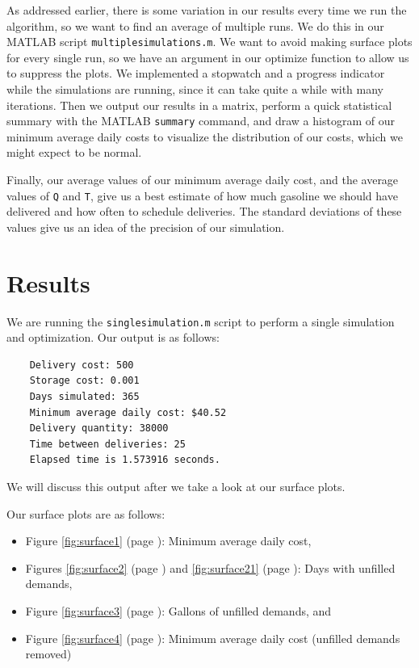\documentclass{article}
\begin{document}
    As addressed earlier, there is some variation in our results every time we run the algorithm, so we want to find an average of multiple runs. We do this in our MATLAB script \texttt{multiplesimulations.m}. We want to avoid making surface plots for every single run, so we have an argument in our optimize function to allow us to suppress the plots.  We implemented a stopwatch and a progress indicator while the simulations are running, since it can take quite a while with many iterations. Then we output our results in a matrix, perform a quick statistical summary with the MATLAB \texttt{summary} command, and draw a histogram of our minimum average daily costs to visualize the distribution of our costs, which we might expect to be normal.

    Finally, our average values of our minimum average daily cost, and the average values of \texttt{Q} and \texttt{T}, give us a best estimate of how much gasoline we should have delivered and how often to schedule deliveries. The standard deviations of these values give us an idea of the precision of our simulation.
    \section*{Results}
    We are running the \texttt{singlesimulation.m} script to perform a single simulation and optimization. Our output is as follows:

    \begin{verbatim}
    Delivery cost: 500
    Storage cost: 0.001
    Days simulated: 365
    Minimum average daily cost: $40.52
    Delivery quantity: 38000
    Time between deliveries: 25
    Elapsed time is 1.573916 seconds.\end{verbatim}

    We will discuss this output after we take a look at our surface plots.

    Our surface plots are as follows:\\
    \begin{itemize}
        \item Figure \ref{fig:surface1} (page \pageref{fig:surface1}): Minimum average daily cost,
        \item Figures \ref{fig:surface2} (page \pageref{fig:surface2}) and \ref{fig:surface21} (page \pageref{fig:surface21}): Days with unfilled demands,
        \item Figure \ref{fig:surface3} (page \pageref{fig:surface3}): Gallons of unfilled demands, and
        \item Figure \ref{fig:surface4} (page \pageref{fig:surface4}): Minimum average daily cost (unfilled demands removed)
    \end{itemize}
\end{document}
